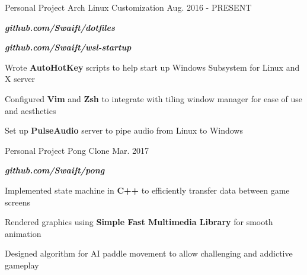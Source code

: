 

\begin{cventries}

  \cventry
    {Personal Project} %
    {Arch Linux Customization} %
    {} %
    {Aug. 2016 - PRESENT} %
    {
      \begin{cvitems} %
        \item {\textbf{\textit{github.com/Swaift/dotfiles}}}
        \item {\textbf{\textit{github.com/Swaift/wsl-startup}}}
        \item {Wrote \textbf{AutoHotKey} scripts to help start up Windows Subsystem for Linux and X server}
        \item {Configured \textbf{Vim} and \textbf{Zsh} to integrate with tiling window manager for ease of use and aesthetics}
        \item {Set up \textbf{PulseAudio} server to pipe audio from Linux to Windows}
      \end{cvitems}
    }

  \cventry
    {Personal Project} %
    {Pong Clone} %
    {} %
    {Mar. 2017} %
    {
      \begin{cvitems} %
        \item {\textbf{\textit{github.com/Swaift/pong}}}
        \item {Implemented state machine in \textbf{C++} to efficiently transfer data between game screens}
        \item {Rendered graphics using \textbf{Simple Fast Multimedia Library} for smooth animation}
        \item {Designed algorithm for AI paddle movement to allow challenging and addictive gameplay}
      \end{cvitems}
    }


\end{cventries}
